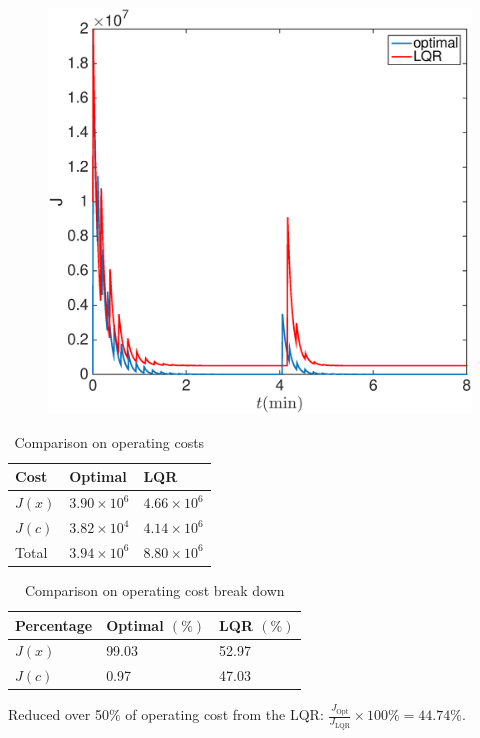 \documentclass{article}
\begin{document}
\begin{figure}[h!]
    \includegraphics[width=0.45\linewidth]{Cost_compare}
\end{figure}
 

\begin{table}
\centering
\caption{Comparison on operating costs}
\begin{tabular}{lll}
\hline
Cost   & Optimal           & LQR               \\ \hline
$J(x)$ & $3.90\times 10^6$ & $4.66\times 10^6$ \\ \hline
$J(c)$ & $3.82\times 10^4$ & $4.14\times 10^6$ \\ \hline
Total  & $3.94\times 10^6$ & $8.80\times 10^6$ \\ \hline
\end{tabular}
\end{table}

\begin{table}
\centering
\caption{Comparison on operating cost break down}
\begin{tabular}{lll}
\hline
Percentage  & Optimal $(\%)$    & LQR $(\%)$    \\ \hline
$J(x)$      & 99.03             & 52.97         \\ \hline
$J(c)$      & 0.97              & 47.03         \\ \hline
\end{tabular}
\end{table}

Reduced over 50$\%$ of operating cost from the LQR: $\displaystyle{\frac{J_{\text{Opt}}}{J_{\text{LQR}}}} \times 100 \%= 44.74 \%$.
\end{document}
